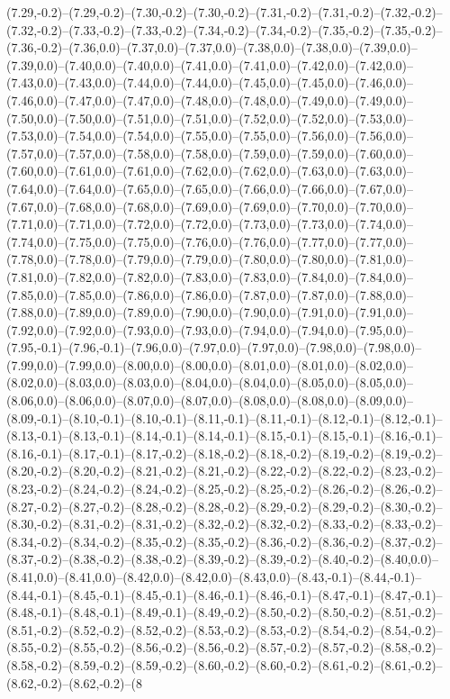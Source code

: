 (7.29,-0.2)--(7.29,-0.2)--(7.30,-0.2)--(7.30,-0.2)--(7.31,-0.2)--(7.31,-0.2)--(7.32,-0.2)--(7.32,-0.2)--(7.33,-0.2)--(7.33,-0.2)--(7.34,-0.2)--(7.34,-0.2)--(7.35,-0.2)--(7.35,-0.2)--(7.36,-0.2)--(7.36,0.0)--(7.37,0.0)--(7.37,0.0)--(7.38,0.0)--(7.38,0.0)--(7.39,0.0)--(7.39,0.0)--(7.40,0.0)--(7.40,0.0)--(7.41,0.0)--(7.41,0.0)--(7.42,0.0)--(7.42,0.0)--(7.43,0.0)--(7.43,0.0)--(7.44,0.0)--(7.44,0.0)--(7.45,0.0)--(7.45,0.0)--(7.46,0.0)--(7.46,0.0)--(7.47,0.0)--(7.47,0.0)--(7.48,0.0)--(7.48,0.0)--(7.49,0.0)--(7.49,0.0)--(7.50,0.0)--(7.50,0.0)--(7.51,0.0)--(7.51,0.0)--(7.52,0.0)--(7.52,0.0)--(7.53,0.0)--(7.53,0.0)--(7.54,0.0)--(7.54,0.0)--(7.55,0.0)--(7.55,0.0)--(7.56,0.0)--(7.56,0.0)--(7.57,0.0)--(7.57,0.0)--(7.58,0.0)--(7.58,0.0)--(7.59,0.0)--(7.59,0.0)--(7.60,0.0)--(7.60,0.0)--(7.61,0.0)--(7.61,0.0)--(7.62,0.0)--(7.62,0.0)--(7.63,0.0)--(7.63,0.0)--(7.64,0.0)--(7.64,0.0)--(7.65,0.0)--(7.65,0.0)--(7.66,0.0)--(7.66,0.0)--(7.67,0.0)--(7.67,0.0)--(7.68,0.0)--(7.68,0.0)--(7.69,0.0)--(7.69,0.0)--(7.70,0.0)--(7.70,0.0)--(7.71,0.0)--(7.71,0.0)--(7.72,0.0)--(7.72,0.0)--(7.73,0.0)--(7.73,0.0)--(7.74,0.0)--(7.74,0.0)--(7.75,0.0)--(7.75,0.0)--(7.76,0.0)--(7.76,0.0)--(7.77,0.0)--(7.77,0.0)--(7.78,0.0)--(7.78,0.0)--(7.79,0.0)--(7.79,0.0)--(7.80,0.0)--(7.80,0.0)--(7.81,0.0)--(7.81,0.0)--(7.82,0.0)--(7.82,0.0)--(7.83,0.0)--(7.83,0.0)--(7.84,0.0)--(7.84,0.0)--(7.85,0.0)--(7.85,0.0)--(7.86,0.0)--(7.86,0.0)--(7.87,0.0)--(7.87,0.0)--(7.88,0.0)--(7.88,0.0)--(7.89,0.0)--(7.89,0.0)--(7.90,0.0)--(7.90,0.0)--(7.91,0.0)--(7.91,0.0)--(7.92,0.0)--(7.92,0.0)--(7.93,0.0)--(7.93,0.0)--(7.94,0.0)--(7.94,0.0)--(7.95,0.0)--(7.95,-0.1)--(7.96,-0.1)--(7.96,0.0)--(7.97,0.0)--(7.97,0.0)--(7.98,0.0)--(7.98,0.0)--(7.99,0.0)--(7.99,0.0)--(8.00,0.0)--(8.00,0.0)--(8.01,0.0)--(8.01,0.0)--(8.02,0.0)--(8.02,0.0)--(8.03,0.0)--(8.03,0.0)--(8.04,0.0)--(8.04,0.0)--(8.05,0.0)--(8.05,0.0)--(8.06,0.0)--(8.06,0.0)--(8.07,0.0)--(8.07,0.0)--(8.08,0.0)--(8.08,0.0)--(8.09,0.0)--(8.09,-0.1)--(8.10,-0.1)--(8.10,-0.1)--(8.11,-0.1)--(8.11,-0.1)--(8.12,-0.1)--(8.12,-0.1)--(8.13,-0.1)--(8.13,-0.1)--(8.14,-0.1)--(8.14,-0.1)--(8.15,-0.1)--(8.15,-0.1)--(8.16,-0.1)--(8.16,-0.1)--(8.17,-0.1)--(8.17,-0.2)--(8.18,-0.2)--(8.18,-0.2)--(8.19,-0.2)--(8.19,-0.2)--(8.20,-0.2)--(8.20,-0.2)--(8.21,-0.2)--(8.21,-0.2)--(8.22,-0.2)--(8.22,-0.2)--(8.23,-0.2)--(8.23,-0.2)--(8.24,-0.2)--(8.24,-0.2)--(8.25,-0.2)--(8.25,-0.2)--(8.26,-0.2)--(8.26,-0.2)--(8.27,-0.2)--(8.27,-0.2)--(8.28,-0.2)--(8.28,-0.2)--(8.29,-0.2)--(8.29,-0.2)--(8.30,-0.2)--(8.30,-0.2)--(8.31,-0.2)--(8.31,-0.2)--(8.32,-0.2)--(8.32,-0.2)--(8.33,-0.2)--(8.33,-0.2)--(8.34,-0.2)--(8.34,-0.2)--(8.35,-0.2)--(8.35,-0.2)--(8.36,-0.2)--(8.36,-0.2)--(8.37,-0.2)--(8.37,-0.2)--(8.38,-0.2)--(8.38,-0.2)--(8.39,-0.2)--(8.39,-0.2)--(8.40,-0.2)--(8.40,0.0)--(8.41,0.0)--(8.41,0.0)--(8.42,0.0)--(8.42,0.0)--(8.43,0.0)--(8.43,-0.1)--(8.44,-0.1)--(8.44,-0.1)--(8.45,-0.1)--(8.45,-0.1)--(8.46,-0.1)--(8.46,-0.1)--(8.47,-0.1)--(8.47,-0.1)--(8.48,-0.1)--(8.48,-0.1)--(8.49,-0.1)--(8.49,-0.2)--(8.50,-0.2)--(8.50,-0.2)--(8.51,-0.2)--(8.51,-0.2)--(8.52,-0.2)--(8.52,-0.2)--(8.53,-0.2)--(8.53,-0.2)--(8.54,-0.2)--(8.54,-0.2)--(8.55,-0.2)--(8.55,-0.2)--(8.56,-0.2)--(8.56,-0.2)--(8.57,-0.2)--(8.57,-0.2)--(8.58,-0.2)--(8.58,-0.2)--(8.59,-0.2)--(8.59,-0.2)--(8.60,-0.2)--(8.60,-0.2)--(8.61,-0.2)--(8.61,-0.2)--(8.62,-0.2)--(8.62,-0.2)--(8